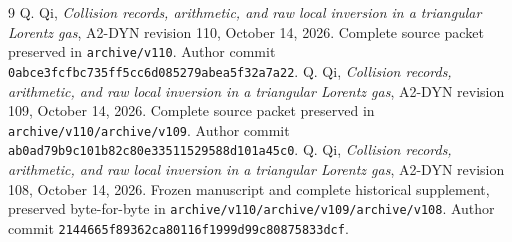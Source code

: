 \documentclass[11pt,reqno]{amsart}
\numberwithin{equation}{section}
\theoremstyle{definition}\newtheorem{definition}[theorem]{Definition}
\theoremstyle{remark}\newtheorem{remark}[theorem]{Remark}
\begin{document}









\appendix


\begin{thebibliography}{9}
 Q. Qi,
\emph{Collision records, arithmetic, and raw local inversion in a
triangular Lorentz gas}, A2-DYN revision 110, October 14, 2026.
Complete source packet preserved in \texttt{archive/v110}.
Author commit \texttt{0abce3fcfbc735ff5cc6d085279abea5f32a7a22}.
 Q. Qi,
\emph{Collision records, arithmetic, and raw local inversion in a
triangular Lorentz gas}, A2-DYN revision 109, October 14, 2026.
Complete source packet preserved in \texttt{archive/v110/archive/v109}.
Author commit \texttt{ab0ad79b9c101b82c80e33511529588d101a45c0}.
 Q. Qi,
\emph{Collision records, arithmetic, and raw local inversion in a
triangular Lorentz gas}, A2-DYN revision 108, October 14, 2026.
Frozen manuscript and complete historical supplement, preserved
byte-for-byte in \texttt{archive/v110/archive/v109/archive/v108}. Author commit
\texttt{2144665f89362ca80116f1999d99c80875833dcf}.
\end{thebibliography}
\end{document}

